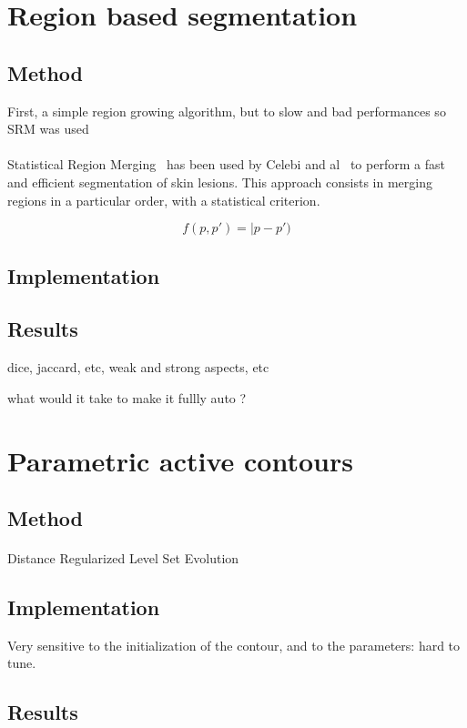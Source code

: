 \documentclass[a4paper,10pt]{article}
\begin{document}
\section{Region based segmentation}
\subsection{Method}
First, a simple region growing algorithm, but to slow and bad performances so SRM was used
\paragraph{} Statistical Region Merging~\cite{nock_statistical_2004} has been 
used by Celebi and al~\cite{celebi_border_2008} to perform a fast and efficient 
segmentation of skin lesions. This approach consists in merging regions in a particular order, with a statistical criterion.

$$
f(p,p')=|p-p')
$$
\subsection{Implementation}

\subsection{Results}
dice, jaccard, etc, weak and strong aspects, etc

what would it take to make it fullly auto ?

\section{Parametric active contours}
\subsection{Method}
\paragraph{}  Distance Regularized Level Set Evolution \cite{li2010distance} 
\subsection{Implementation}
Very sensitive to the initialization of the contour, and to the parameters: hard to tune.

\subsection{Results}
\end{document}
